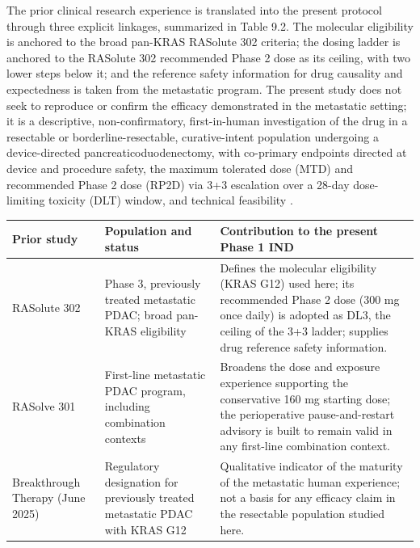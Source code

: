 The prior clinical research experience is translated into the present protocol
through three explicit linkages, summarized in Table 9.2. The molecular
eligibility is anchored to the broad pan-KRAS RASolute 302 criteria; the dosing
ladder is anchored to the RASolute 302 recommended Phase 2 dose as its ceiling,
with two lower steps below it; and the reference safety information for drug
causality and expectedness is taken from the metastatic program. The present study
does not seek to reproduce or confirm the efficacy demonstrated in the metastatic
setting; it is a descriptive, non-confirmatory, first-in-human investigation of the
drug in a resectable or borderline-resectable, curative-intent population
undergoing a device-directed pancreaticoduodenectomy, with co-primary endpoints
directed at device and procedure safety, the maximum tolerated dose (MTD) and
recommended Phase 2 dose (RP2D) via 3+3 escalation over a 28-day dose-limiting
toxicity (DLT) window, and technical feasibility \cite{phase1guidance, daraxwhipple}.

\noindent\begin{tabularx}{\textwidth}{L{3.6cm} L{4.6cm} Y}
\toprule
\textbf{Prior study} & \textbf{Population and status} & \textbf{Contribution to the present Phase 1 IND} \\
\midrule
RASolute 302 & Phase 3, previously treated metastatic PDAC; broad pan-KRAS eligibility & Defines the molecular eligibility (KRAS G12) used here; its recommended Phase 2 dose (300 mg once daily) is adopted as DL3, the ceiling of the 3+3 ladder; supplies drug reference safety information. \\
RASolve 301 & First-line metastatic PDAC program, including combination contexts & Broadens the dose and exposure experience supporting the conservative 160 mg starting dose; the perioperative pause-and-restart advisory is built to remain valid in any first-line combination context. \\
Breakthrough Therapy (June 2025) & Regulatory designation for previously treated metastatic PDAC with KRAS G12 & Qualitative indicator of the maturity of the metastatic human experience; not a basis for any efficacy claim in the resectable population studied here. \\
\bottomrule
\end{tabularx}
\vspace{-0.2cm}

